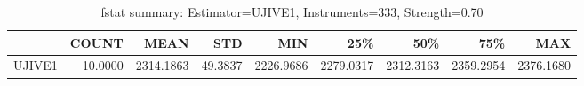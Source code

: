 \begin{table}[ht]
\centering
\caption{fstat summary: Estimator=UJIVE1, Instruments=333, Strength=0.70}
\begin{tabular}{lrrrrrrrr}
\toprule
 & COUNT & MEAN & STD & MIN & 25\% & 50\% & 75\% & MAX \\
\midrule
UJIVE1 & 10.0000 & 2314.1863 & 49.3837 & 2226.9686 & 2279.0317 & 2312.3163 & 2359.2954 & 2376.1680 \\
\bottomrule
\end{tabular}
\end{table}
